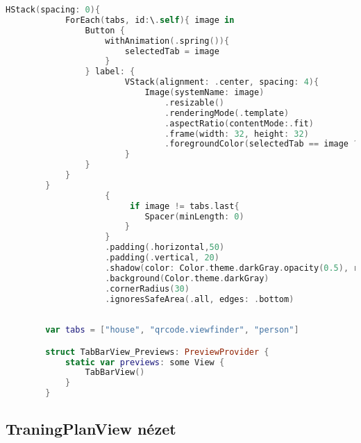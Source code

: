 \hspace{-10mm}
\begin{minipage}{\textwidth}
    \linespread{0.8}\selectfont
    \begin{lstlisting}[language=swift]
        HStack(spacing: 0){
            ForEach(tabs, id:\.self){ image in
                Button {
                    withAnimation(.spring()){
                        selectedTab = image
                    }
                } label: {
                        VStack(alignment: .center, spacing: 4){
                            Image(systemName: image)
                                .resizable()
                                .renderingMode(.template)
                                .aspectRatio(contentMode:.fit)
                                .frame(width: 32, height: 32)
                                .foregroundColor(selectedTab == image ?  Color.theme.lighBlue : Color.theme.white)
                        }
                }
            }
        }
                    {
                         if image != tabs.last{
                            Spacer(minLength: 0)
                        }
                    }
                    .padding(.horizontal,50)
                    .padding(.vertical, 20)
                    .shadow(color: Color.theme.darkGray.opacity(0.5), radius:4, x:0, y: -1)
                    .background(Color.theme.darkGray)
                    .cornerRadius(30)
                    .ignoresSafeArea(.all, edges: .bottom)
            
        
        var tabs = ["house", "qrcode.viewfinder", "person"]

        struct TabBarView_Previews: PreviewProvider {
            static var previews: some View {
                TabBarView()
            }
        }

    \end{lstlisting}   
\end{minipage}

\subsection*{TraningPlanView nézet}

